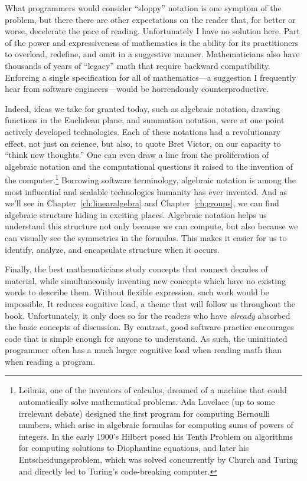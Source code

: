 What programmers would consider ``sloppy'' notation is one symptom of the
problem, but there there are other expectations on the reader that, for better
or worse, decelerate the pace of reading.  Unfortunately I have no solution
here. Part of the power and expressiveness of mathematics is the ability for
its practitioners to overload, redefine, and omit in a suggestive manner.
Mathematicians also have thousands of years of ``legacy'' math that require
backward compatibility. Enforcing a single specification for all of
mathematics---a suggestion I frequently hear from software engineers---would be
horrendously counterproductive.

Indeed, ideas we take for granted today, such as algebraic notation, drawing
functions in the Euclidean plane, and summation notation, were at one point
actively developed technologies. Each of these notations had a revolutionary
effect, not just on science, but also, to quote Bret Victor, on our capacity to
``think new thoughts.''  One can even draw a line from the proliferation of
algebraic notation and the computational questions it raised to the invention
of the computer.\footnote{Leibniz, one of the inventors of calculus, dreamed of
a machine that could automatically solve mathematical problems. Ada Lovelace
(up to some irrelevant debate) designed the first program for computing
Bernoulli numbers, which arise in algebraic formulas for computing sums of
powers of integers. In the early 1900's Hilbert posed his Tenth Problem on
algorithms for computing solutions to Diophantine equations, and later his
Entscheidungsproblem, which was solved concurrently by Church and Turing and
directly led to Turing's code-breaking computer.} Borrowing software
terminology, algebraic notation is among the most influential and scalable
technologies humanity has ever invented.  And as we'll see in
Chapter~\ref{ch:linearalgebra} and Chapter~\ref{ch:groups}, we can find
algebraic structure hiding in exciting places. Algebraic notation helps us
understand this structure not only because we can compute, but also because we
can visually see the symmetries in the formulas. This makes it easier for us to
identify, analyze, and encapsulate structure when it occurs.

Finally, the best mathematicians study concepts that connect decades of
material, while simultaneously inventing new concepts which have no existing
words to describe them.  Without flexible expression, such work would be
impossible. It reduces cognitive load, a theme that will follow us throughout
the book. Unfortunately, it only does so for the readers who have
\emph{already} absorbed the basic concepts of discussion. By contrast, good
software practice encourages code that is simple enough for anyone to
understand. As such, the uninitiated programmer often has a much larger
cognitive load when reading math than when reading a program.

